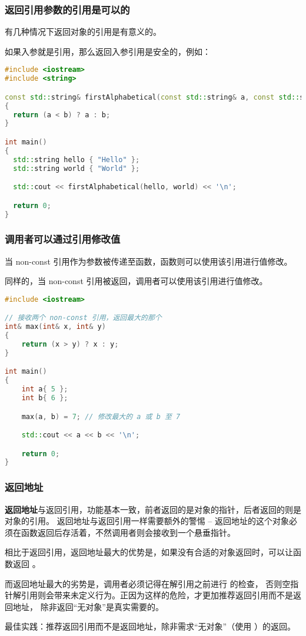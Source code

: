 \documentclass[../../LearnCpp.tex]{subfiles}
\begin{document}
\subsubsection*{返回引用参数的引用是可以的}

有几种情况下返回对象的引用是有意义的。

如果入参就是引用，那么返回入参引用是安全的，例如：

\begin{lstlisting}[language=C++]
#include <iostream>
#include <string>

const std::string& firstAlphabetical(const std::string& a, const std::string& b)
{
  return (a < b) ? a : b;
}

int main()
{
  std::string hello { "Hello" };
  std::string world { "World" };

  std::cout << firstAlphabetical(hello, world) << '\n';

  return 0;
}
\end{lstlisting}

\subsubsection*{调用者可以通过引用修改值}

当 non-const 引用作为参数被传递至函数，函数则可以使用该引用进行值修改。

同样的，当 non-const 引用被返回，调用者可以使用该引用进行值修改。

\begin{lstlisting}[language=C++]
#include <iostream>

// 接收两个 non-const 引用，返回最大的那个
int& max(int& x, int& y)
{
    return (x > y) ? x : y;
}

int main()
{
    int a{ 5 };
    int b{ 6 };

    max(a, b) = 7; // 修改最大的 a 或 b 至 7

    std::cout << a << b << '\n';

    return 0;
}
\end{lstlisting}

\subsubsection*{返回地址}

\textbf{返回地址}与返回引用，功能基本一致，前者返回的是对象的指针，后者返回的则是对象的引用。
返回地址与返回引用一样需要额外的警惕 -- 返回地址的这个对象必须在函数返回后存活着，不然调用者则会接收到一个悬垂指针。

相比于返回引用，返回地址最大的优势是，如果没有合适的对象返回时，可以让函数返回 。

而返回地址最大的劣势是，调用者必须记得在解引用之前进行  的检查，
否则空指针解引用则会带来未定义行为。正因为这样的危险，才更加推荐返回引用而不是返回地址，
除非返回“无对象”是真实需要的。

最佳实践：推荐返回引用而不是返回地址，除非需求“无对象”（使用 ）的返回。
\end{document}
